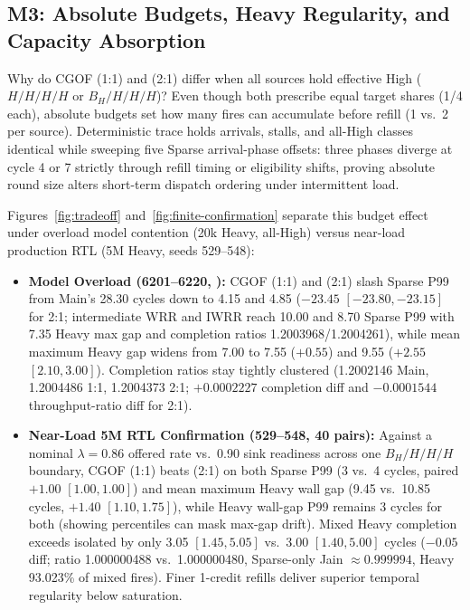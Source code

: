 \subsection{M3: Absolute Budgets, Heavy Regularity, and Capacity Absorption}
Why do CGOF (1:1) and (2:1) differ when all sources hold effective High ($H/H/H/H$ or $B_H/H/H/H$)? Even though both prescribe equal target shares (1/4 each), absolute budgets set how many fires can accumulate before refill (1 vs.\ 2 per source). Deterministic trace  holds arrivals, stalls, and all-High classes identical while sweeping five Sparse arrival-phase offsets: three phases diverge at cycle 4 or 7 strictly through refill timing or eligibility shifts, proving absolute round size alters short-term dispatch ordering under intermittent load.

Figures~\ref{fig:tradeoff} and~\ref{fig:finite-confirmation} separate this budget effect under overload model contention (20k Heavy, all-High) versus near-load production RTL (5M Heavy, seeds 529--548):
\begin{itemize}
\item \textbf{Model Overload (6201--6220, ):} CGOF (1:1) and (2:1) slash Sparse P99 from Main's 28.30 cycles down to 4.15 and 4.85 ($-23.45$ $[-23.80, -23.15]$ for 2:1; intermediate WRR and IWRR reach 10.00 and 8.70 Sparse P99 with 7.35 Heavy max gap and completion ratios 1.2003968/1.2004261), while mean maximum Heavy gap widens from 7.00 to 7.55 ($+0.55$) and 9.55 ($+2.55$ $[2.10, 3.00]$). Completion ratios stay tightly clustered (1.2002146 Main, 1.2004486 1:1, 1.2004373 2:1; $+0.0002227$ completion diff and $-0.0001544$ throughput-ratio diff for 2:1).
\item \textbf{Near-Load 5M RTL Confirmation (529--548, 40 pairs):} Against a nominal $\lambda=0.86$ offered rate vs.\ 0.90 sink readiness across one $B_H/\allowbreak H/\allowbreak H/\allowbreak H$ boundary, CGOF (1:1) beats (2:1) on both Sparse P99 (3 vs.\ 4 cycles, paired $+1.00$ $[1.00, 1.00]$) and mean maximum Heavy wall gap (9.45 vs.\ 10.85 cycles, $+1.40$ $[1.10, 1.75]$), while Heavy wall-gap P99 remains 3 cycles for both (showing percentiles can mask max-gap drift). Mixed Heavy completion exceeds isolated by only 3.05 $[1.45, 5.05]$ vs.\ 3.00 $[1.40, 5.00]$ cycles ($-0.05$ diff; ratio 1.000000488 vs.\ 1.000000480, Sparse-only Jain $\approx 0.999994$, Heavy 93.023\% of mixed fires). Finer 1-credit refills deliver superior temporal regularity below saturation.
\end{itemize}

